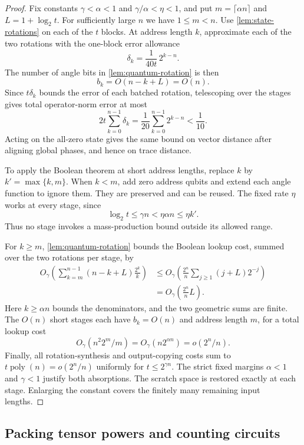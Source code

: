 \documentclass[11pt]{article}
\newcommand{\poly}{\operatorname{poly}}
\begin{document}
\begin{proof}
Fix constants $\gamma<\alpha<1$ and $\gamma/\alpha<\eta<1$,
and put $m=\lceil\alpha n\rceil$ and $L=1+\log_2t$.
For sufficiently large $n$ we have $1\le m<n$.
Use \cref{lem:state-rotations} on each of the $t$ blocks.  At address
length $k$, approximate each of the two rotations with the one-block
error allowance
\[
 \delta_k=\frac{1}{40t}\,2^{k-n}.
\]
The number of angle bits in \cref{lem:quantum-rotation} is then
\[
 b_k=O(n-k+L)=O(n).
\]
Since $t\delta_k$ bounds the error of each batched rotation, telescoping
over the stages gives total operator-norm error at most
\[
 2t\sum_{k=0}^{n-1}\delta_k
   =\frac1{20}\sum_{k=0}^{n-1}2^{k-n}<\frac1{10}.
\]
Acting on the all-zero state gives the same bound on vector distance
after aligning global phases, and hence on trace distance.

To apply the Boolean theorem at short address lengths, replace $k$ by
$k'=\max\{k,m\}$.  When $k<m$, add zero address qubits and extend
each angle function to ignore them.  They are preserved and can be
reused.  The fixed rate $\eta$ works at every stage, since
\[
 \log_2t\le\gamma n<\eta\alpha n\le\eta k'.
\]
Thus no stage invokes a mass-production bound outside its allowed range.

For $k\ge m$, \cref{lem:quantum-rotation} bounds the Boolean lookup
cost, summed over the two rotations per stage, by
\begin{align*}
 O_\gamma\!\left(\sum_{k=m}^{n-1}(n-k+L)\frac{2^k}{k}\right)
 &\le O_\gamma\!\left(\frac{2^n}{n}
                  \sum_{j\ge1}(j+L)2^{-j}\right)\\
 &=O_\gamma\!\left(\frac{2^n}{n}L\right).
\end{align*}
Here $k\ge\alpha n$ bounds the denominators, and the two geometric
sums are finite.  The $O(n)$ short stages each have $b_k=O(n)$ and
address length $m$, for a total lookup cost
\[
 O_\gamma(n^2 2^m/m)=O_\gamma(n2^{\alpha n})=o(2^n/n).
\]
Finally, all rotation-synthesis and output-copying costs sum to
$t\poly(n)=o(2^n/n)$ uniformly for $t\le2^{\gamma n}$.
The strict fixed margins $\alpha<1$ and $\gamma<1$ justify both
absorptions.  The scratch space is restored exactly at each stage.
Enlarging the constant covers the finitely many remaining input lengths.
\end{proof}

\subsection{Packing tensor powers and counting circuits}
\end{document}
